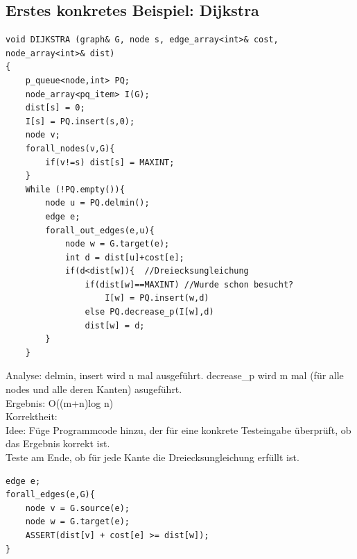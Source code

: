 \documentclass[a4paper]{article}
\begin{document}
\subsection*{Erstes konkretes Beispiel: Dijkstra}
\begin{lstlisting}
void DIJKSTRA (graph& G, node s, edge_array<int>& cost, node_array<int>& dist)
{
	p_queue<node,int> PQ;
	node_array<pq_item> I(G);
	dist[s] = 0;
	I[s] = PQ.insert(s,0);
	node v;
	forall_nodes(v,G){
		if(v!=s) dist[s] = MAXINT;
	}
	While (!PQ.empty()){
		node u = PQ.delmin();
		edge e;
		forall_out_edges(e,u){
			node w = G.target(e);
			int d = dist[u]+cost[e];
			if(d<dist[w]){	//Dreiecksungleichung
				if(dist[w]==MAXINT) //Wurde schon besucht?
					I[w] = PQ.insert(w,d)
				else PQ.decrease_p(I[w],d)
				dist[w] = d;
		}
	}		
\end{lstlisting}
Analyse: delmin, insert wird n mal ausgeführt. decrease\_p wird m mal (für alle nodes und alle deren Kanten) asugeführt.\\
Ergebnis: O((m+n)log n)\\
Korrektheit:\\
Idee: Füge Programmcode hinzu, der für eine konkrete Testeingabe überprüft, ob das Ergebnis korrekt ist.\\
Teste am Ende, ob für jede Kante die Dreiecksungleichung erfüllt ist.
\begin{lstlisting}
edge e;
forall_edges(e,G){
	node v = G.source(e);
	node w = G.target(e);
	ASSERT(dist[v] + cost[e] >= dist[w]);
}
\end{lstlisting}
\end{document}
